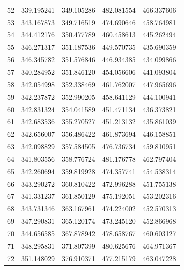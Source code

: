 \begin{table}
\begin{tabular}{rrrrr}
52 & 339.195241 & 349.105286 & 482.081554 & 466.337606 \\
53 & 343.167873 & 349.716519 & 474.690646 & 458.764981 \\
54 & 344.412176 & 350.477789 & 460.458613 & 445.262494 \\
55 & 346.271317 & 351.187536 & 449.570735 & 435.690359 \\
56 & 346.345782 & 351.576846 & 446.934385 & 434.099866 \\
57 & 340.284952 & 351.846120 & 454.056606 & 441.093804 \\
58 & 342.054998 & 352.338469 & 461.762007 & 447.965696 \\
59 & 342.237872 & 352.990205 & 458.641129 & 444.100941 \\
60 & 342.831324 & 354.041589 & 451.471134 & 436.373821 \\
61 & 342.683536 & 355.270527 & 451.213132 & 435.861039 \\
62 & 342.656007 & 356.486422 & 461.873694 & 446.158851 \\
63 & 342.098829 & 357.584505 & 476.736734 & 459.810951 \\
64 & 341.803556 & 358.776724 & 481.176778 & 462.797404 \\
65 & 342.260694 & 359.819928 & 474.357741 & 454.538314 \\
66 & 343.290272 & 360.810422 & 472.996288 & 451.755138 \\
67 & 341.331237 & 361.850129 & 475.192051 & 453.202316 \\
68 & 343.731346 & 363.167961 & 474.224002 & 452.570313 \\
69 & 347.290831 & 365.120174 & 473.245120 & 452.866968 \\
70 & 344.656585 & 367.878942 & 478.658767 & 460.603127 \\
71 & 348.295831 & 371.807399 & 480.625676 & 464.971367 \\
72 & 351.148029 & 376.910371 & 477.215179 & 463.047228 \\
\bottomrule
\end{tabular}
\end{table}
